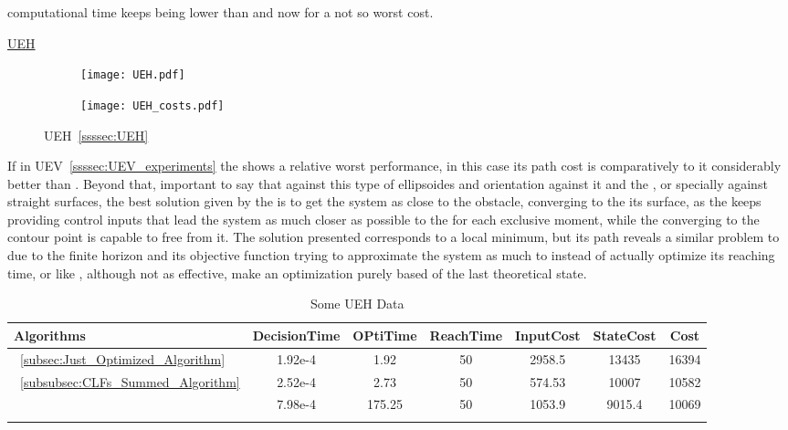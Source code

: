   computational time keeps being lower than  and now for a not so worst cost.


  \newpage %


\underline{UEH}
\label{ssssec:UEH_experiments} %

 \begin{figure}[htbp]
  \begin{subfigure}{0.5\textwidth}
    \centering
    \texttt{[image: UEH.pdf]}
  \label{fig:UEH_CostEvol}
  \end{subfigure}
  \begin{subfigure}{0.6\textwidth}
    \centering
    \texttt{[image: UEH\_costs.pdf]}
  \label{fig:UEH_trajectory}
  \end{subfigure}
  \caption{UEH~\ref{ssssec:UEH}}
\label{fig:UEHTrajectory_and_CostEvol}
\end{figure}


If in UEV~\ref{ssssec:UEV_experiments} the  shows a relative worst performance, in this case its path cost is comparatively to it considerably better than . Beyond that, important to say that against this type of ellipsoides and orientation against it and the \txtref, or specially against straight surfaces, the best solution given by the  is to get the system as close to the obstacle, converging to the its surface, as the  keeps providing control inputs that lead the system as much closer as possible to the \txtref for each exclusive moment, while the  converging to the contour point is capable to free from it. The  solution presented corresponds to a local minimum, but its path reveals a similar problem to  due to the finite horizon and its objective function trying to approximate the system as much to \txtref instead of actually optimize its reaching time, or like , although not as effective, make an optimization purely based of the last theoretical state.  


  \bgroup
 \begin{xltabular}{\textwidth}{|l|cccccc|}
   \toprule
   Algorithms   & DecisionTime & OPtiTime & ReachTime  & InputCost   & StateCost & Cost           \\
   \midrule
    ~\ref{subsec:Just_Optimized_Algorithm}           & 1.92e-4 & 1.92 & 50 & 2958.5 & 13435  & 16394 \\
    ~\ref{subsubsec:CLFs_Summed_Algorithm}        & 2.52e-4 & 2.73 & 50 & 574.53 & 10007 & 10582  \\
                                                      & 7.98e-4 & 175.25  & 50  & 1053.9  & 9015.4 & 10069 \\
    \midrule
    \caption{Some UEH Data}
    \label{tab:Some_UEH_Data}\\
   \end{xltabular}
 \egroup

